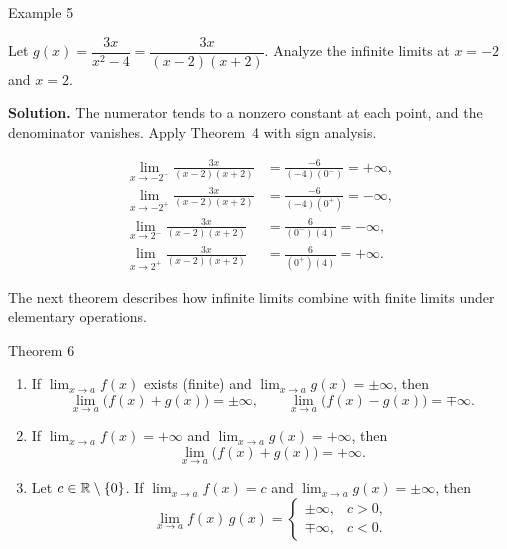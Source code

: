 \begin{examplebox}{Example 5}

Let \(g(x) = \dfrac{3x}{x^{2} - 4} = \dfrac{3x}{(x - 2)(x + 2)}\). Analyze the infinite limits at \(x = -2\) and \(x = 2\).

\medskip
\textbf{Solution.}
The numerator tends to a nonzero constant at each point, and the denominator vanishes. Apply Theorem~4 with sign analysis.

\begin{align*}
\lim_{x \to -2^{-}} \frac{3x}{(x - 2)(x + 2)}
    &= \frac{-6}{(-4)(0^{-})} = +\infty, \\[6pt]
\lim_{x \to -2^{+}} \frac{3x}{(x - 2)(x + 2)}
    &= \frac{-6}{(-4)(0^{+})} = -\infty, \\[6pt]
\lim_{x \to 2^{-}} \frac{3x}{(x - 2)(x + 2)}
    &= \frac{6}{(0^{-})(4)} = -\infty, \\[6pt]
\lim_{x \to 2^{+}} \frac{3x}{(x - 2)(x + 2)}
    &= \frac{6}{(0^{+})(4)} = +\infty.
\end{align*}
\end{examplebox}

\bigskip

The next theorem describes how infinite limits combine with finite limits under elementary operations.


\begin{theorembox}{Theorem 6}

\begin{enumerate}
    \item If \(\displaystyle\lim_{x \to a} f(x)\) exists (finite) and \(\displaystyle\lim_{x \to a} g(x) = \pm\infty\), then
    \[
    \lim_{x \to a} \bigl(f(x) + g(x)\bigr) = \pm\infty,
    \qquad
    \lim_{x \to a} \bigl(f(x) - g(x)\bigr) = \mp\infty.
    \]

    \item If \(\displaystyle\lim_{x \to a} f(x) = +\infty\) and \(\displaystyle\lim_{x \to a} g(x) = +\infty\), then
    \[
    \lim_{x \to a} \bigl(f(x) + g(x)\bigr) = +\infty.
    \]

    \item Let \(c \in \mathbb{R} \setminus \{0\}\). If \(\displaystyle\lim_{x \to a} f(x) = c\) and \(\displaystyle\lim_{x \to a} g(x) = \pm\infty\), then
    \[
    \lim_{x \to a} f(x)\,g(x) = \begin{cases}
    \pm\infty, & c > 0,\\
    \mp\infty, & c < 0.
    \end{cases}
    \]
\end{enumerate}
\end{theorembox}


